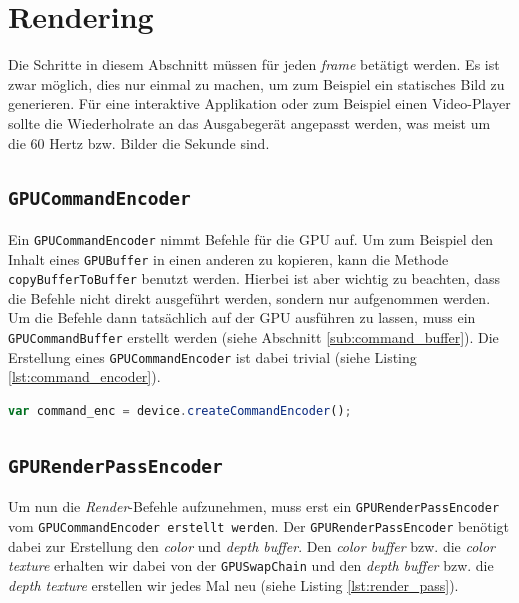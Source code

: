\documentclass[oneside]{ausarbeitung}
\begin{document}
\section{Rendering}
Die Schritte in diesem Abschnitt müssen für jeden \textit{frame} betätigt werden. Es ist zwar möglich, dies nur einmal zu machen, um zum Beispiel ein statisches Bild zu generieren. Für eine interaktive Applikation oder zum Beispiel einen Video-Player sollte die Wiederholrate an das Ausgabegerät angepasst werden, was meist um die 60 Hertz bzw. Bilder die Sekunde sind.

\subsection{\texttt{GPUCommandEncoder}}
Ein \texttt{GPUCommandEncoder} nimmt Befehle für die \ac{GPU} auf. Um zum Beispiel den Inhalt eines \texttt{GPUBuffer} in einen anderen zu kopieren, kann die Methode \texttt{copyBufferToBuffer} benutzt werden. Hierbei ist aber wichtig zu beachten, dass die Befehle nicht direkt ausgeführt werden, sondern nur aufgenommen werden. Um die Befehle dann tatsächlich auf der \ac{GPU} ausführen zu lassen, muss ein \texttt{GPUCommandBuffer} erstellt werden (siehe Abschnitt \ref{sub:command_buffer}). Die Erstellung eines \texttt{GPUCommandEncoder} ist dabei trivial (siehe Listing \ref{lst:command_encoder}).

\begin{lstlisting}[language=JavaScript, label={lst:command_encoder}, caption={Erstellen eines \texttt{GPUCommandEncoder}}]
var command_enc = device.createCommandEncoder();
\end{lstlisting}

\subsection{\texttt{GPURenderPassEncoder}}
Um nun die \textit{Render}-Befehle aufzunehmen, muss erst ein \texttt{GPURenderPassEncoder} vom \texttt{GPUCommandEncoder erstellt werden}. Der \texttt{GPURenderPassEncoder} benötigt dabei zur Erstellung den \textit{color} und \textit{depth buffer}. Den \textit{color buffer} bzw. die \textit{color texture} erhalten wir dabei von der \texttt{GPUSwapChain} und den \textit{depth buffer} bzw. die \textit{depth texture} erstellen wir jedes Mal neu (siehe Listing \ref{lst:render_pass}).
\end{document}
